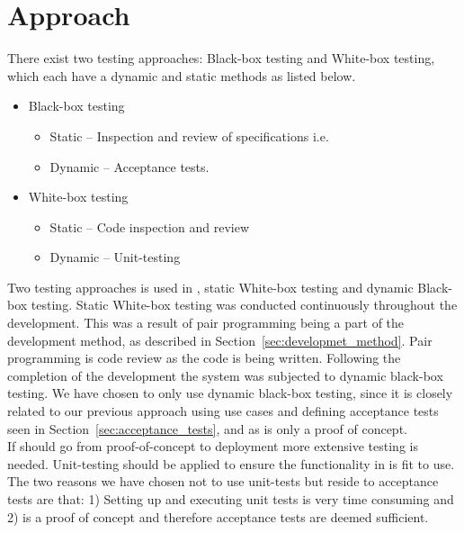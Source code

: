 \section{Approach}
\label{sec:testing_approach}
There exist two testing approaches: Black-box testing and White-box testing, which each have a dynamic and static methods as listed below.

\begin{itemize}
	\item Black-box testing
		\begin{itemize}
			\item Static -- Inspection and review of specifications i.e.
			\item Dynamic -- Acceptance tests.
		\end{itemize}

	\item White-box testing
		\begin{itemize}
			\item Static -- Code inspection and review
			\item Dynamic -- Unit-testing
		\end{itemize}
\end{itemize}

Two testing approaches is used in \projectname{}, static White-box testing and dynamic Black-box testing.
Static White-box testing was conducted continuously throughout the development.
This was a result of pair programming being a part of the development method, as described in Section~\ref{sec:developmet_method}.
Pair programming is code review as the code is being written\citep{Patton06}.
Following the completion of the development the system was subjected to dynamic black-box testing.
We have chosen to only use dynamic black-box testing, since it is closely related to our previous approach using use cases and defining acceptance tests seen in Section~\ref{sec:acceptance_tests}, and as \projectname{} is only a proof of concept.\\

If \projectname{} should go from proof-of-concept to deployment more extensive testing is needed.
Unit-testing should be applied to ensure the functionality in \projectname{} is fit to use.
The two reasons we have chosen not to use unit-tests but reside to acceptance tests are that: 1) Setting up and executing unit tests is very time consuming and 2) \projectname{} is a proof of concept and therefore acceptance tests are deemed sufficient.\\

